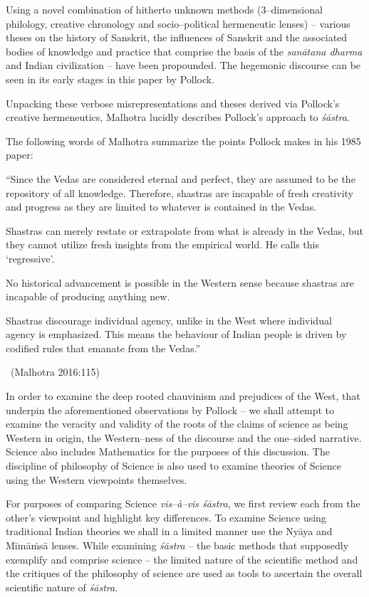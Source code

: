 Using a novel combination of hitherto unknown methods (3–dimensional philology, creative chronology and socio–political hermeneutic lenses) – various theses on the history of Sanskrit, the influences of Sanskrit and the associated bodies of knowledge and practice that comprise the basis of the \textit{sanātana dharma} and Indian civilization – have been propounded. The hegemonic discourse can be seen in its early stages in this paper by Pollock.

Unpacking these verbose misrepresentations and theses derived via Pollock’s creative hermeneutics, Malhotra lucidly describes Pollock’s approach to \textit{śāstra}.

The following words of Malhotra summarize the points Pollock makes in his 1985 paper:

\item “Since the Vedas are considered eternal and perfect, they are assumed to be the repository of all knowledge. Therefore, shastras are incapable of fresh creativity and progress as they are limited to whatever is contained in the Vedas.

 \item Shastras can merely restate or extrapolate from what is already in the Vedas, but they cannot utilize fresh insights from the empirical world. He calls this ‘regressive’.

 \item No historical advancement is possible in the Western sense because shastras are incapable of producing anything new.

 \item Shastras discourage individual agency, unlike in the West where individual agency is emphasized. This means the behaviour of Indian people is driven by codified rules that emanate from the Vedas.”

~\hfill (Malhotra 2016:115)

In order to examine the deep rooted chauvinism and prejudices of the West, that underpin the aforementioned observations by Pollock – we shall attempt to examine the veracity and validity of the roots of the claims of science as being Western in origin, the Western–ness of the discourse and the one–sided narrative. Science also includes Mathematics for the purposes of this discussion. The discipline of philosophy of Science is also used to examine theories of Science using the Western viewpoints themselves.

For purposes of comparing Science \textit{vis–à–vis śāstra}, we first review each from the other’s viewpoint and highlight key differences. To examine Science using traditional Indian theories we shall in a limited manner use the Nyāya and Mīmāṁsā lenses. While examining \textit{śāstra} – the basic methods that supposedly exemplify and comprise science – the limited nature of the scientific method and the critiques of the philosophy of science are used as tools to ascertain the overall scientific nature of \textit{śāstra}.


